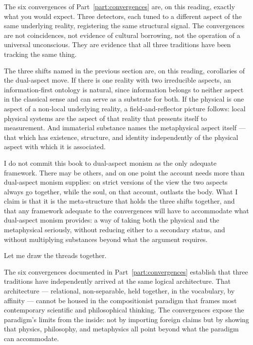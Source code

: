 The six convergences of Part~\ref{part:convergences} are, on this reading,
exactly what you would expect. Three detectors, each tuned to a different
aspect of the same underlying reality, registering the same structural signal.
The convergences are not coincidences, not evidence of cultural borrowing, not
the operation of a universal unconscious. They are evidence that all three
traditions have been tracking the same thing.

The three shifts named in the previous section are, on this reading, corollaries
of the dual-aspect move. If there is one reality with two irreducible aspects,
an information-first ontology is natural, since information belongs to neither
aspect in the classical sense and can serve as a substrate for both. If the
physical is one aspect of a non-local underlying reality, a field-and-reflector
picture follows: local physical systems are the aspect of that reality that
presents itself to measurement. And immaterial substance names the metaphysical
aspect itself --- that which has existence, structure, and identity
independently of the physical aspect with which it is associated.

I do not commit this book to dual-aspect monism as the only adequate framework.
There may be others, and on one point the \bahai account needs more than
dual-aspect monism supplies: on strict versions of the view the two aspects
always go together, while the soul, on that account, outlasts the body. What I
claim is that it is the meta-structure that holds the three shifts together, and that any framework adequate to the convergences
will have to accommodate what dual-aspect monism provides: a way of taking both
the physical and the metaphysical seriously, without reducing either to a
secondary status, and without multiplying substances beyond what the argument
requires.



Let me draw the threads together.

The six convergences documented in Part~\ref{part:convergences} establish that
three traditions have independently arrived at the same logical architecture.
That architecture --- relational, non-separable, held together, in the \bahai
vocabulary, by affinity --- cannot be housed in the
compositionist paradigm that frames most contemporary scientific and
philosophical thinking. The convergences expose the paradigm's limits from the
inside: not by importing foreign claims but by showing that physics,
philosophy, and \bahai metaphysics all point beyond what the paradigm can
accommodate.

